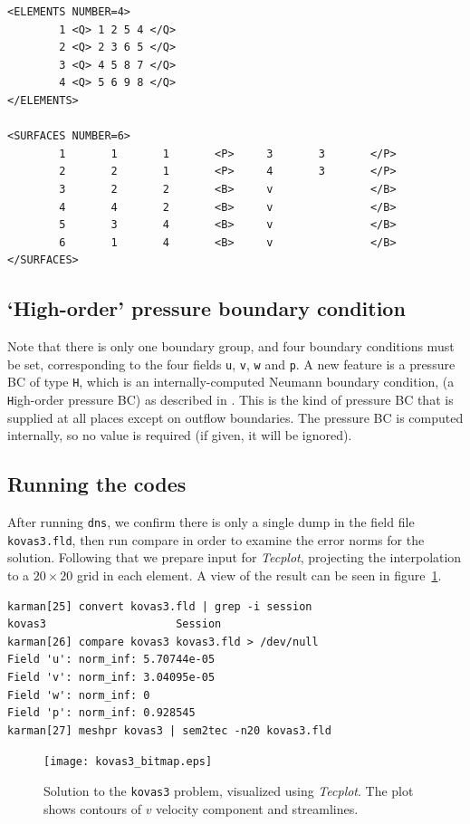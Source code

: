 \documentclass[11pt,a4paper]{report}
\begin{document}
{\begin{verbatim}
<ELEMENTS NUMBER=4>
        1 <Q> 1 2 5 4 </Q>
        2 <Q> 2 3 6 5 </Q>
        3 <Q> 4 5 8 7 </Q>
        4 <Q> 5 6 9 8 </Q>
</ELEMENTS>

<SURFACES NUMBER=6>
        1       1       1       <P>     3       3       </P>
        2       2       1       <P>     4       3       </P>
        3       2       2       <B>     v               </B>
        4       4       2       <B>     v               </B>
        5       3       4       <B>     v               </B>
        6       1       4       <B>     v               </B>
</SURFACES>
\end{verbatim}
}

\subsection{`High-order' pressure boundary condition}

Note that there is only one boundary group, and four boundary
conditions must be set, corresponding to the four fields \verb+u+,
\verb+v+, \verb+w+ and \verb+p+.  A new feature is a pressure BC of
type \verb+H+, which is an internally-computed Neumann boundary
condition, (a \verb+H+igh-order pressure BC) as described in
\citet{kio91}.  This is the kind of pressure BC that is supplied at
all places except on outflow boundaries.  The pressure BC is computed
internally, so no value is required (if given, it will be ignored).

\subsection{Running the codes}

After running \verb+dns+, we confirm there is only a single dump in the
field file \verb+kovas3.fld+, then run compare in order to examine the
error norms for the solution.  Following that we prepare input for
\emph{Tecplot}, projecting the interpolation to a $20\times20$ grid in each
element.  A view of the result can be seen in figure~\ref{kov3soln}.
{\small
\begin{verbatim}
karman[25] convert kovas3.fld | grep -i session
kovas3                    Session
karman[26] compare kovas3 kovas3.fld > /dev/null
Field 'u': norm_inf: 5.70744e-05
Field 'v': norm_inf: 3.04095e-05
Field 'w': norm_inf: 0
Field 'p': norm_inf: 0.928545
karman[27] meshpr kovas3 | sem2tec -n20 kovas3.fld
\end{verbatim}
}
\begin{figure}
\begin{center}
\texttt{[image: kovas3\_bitmap.eps]}
\end{center}
\caption{
\label{kov3soln}
  Solution to the \texttt{kovas3} problem, visualized using
  \emph{Tecplot}.  The plot shows contours of $v$ velocity component
  and streamlines.  }
\end{figure}
\end{document}
